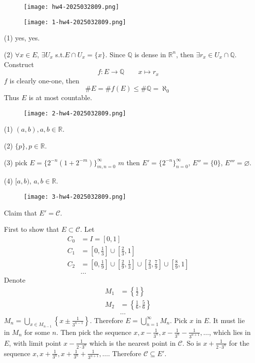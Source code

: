 \begin{figure}[H]
\centering
\texttt{[image: hw4-2025032809.png]}
\label{}
\end{figure}

\begin{figure}[H]
\centering
\texttt{[image: 1-hw4-2025032809.png]}
\label{}
\end{figure}

(1) yes, yes.

(2) $\forall x\in E$, $\exists U_{x}$ s.t.$E\cap U_{x}=\{ x \}$. Since $\mathbb{Q}$ is dense in $\mathbb{R}^{n}$, then $\exists r_{x}\in U_{x}\cap \mathbb{Q}$. Construct
\[
f:E\to \mathbb{Q}\qquad x\mapsto r_{x}
\]
$f$ is clearly one-one, then
\[
\#E=\#f(E)\leq \#\mathbb{Q}=\aleph_0
\]
Thus $E$ is at most countable.

\begin{figure}[H]
\centering
\texttt{[image: 2-hw4-2025032809.png]}
\label{}
\end{figure}

(1) $(a, b), a, b\in \mathbb{R}$.

(2) $\{ p \}, p\in \mathbb{R}$.

(3) pick $E=\{ 2^{-n}(1+2^{-m}) \}_{m,n=0}^{\infty}$ $m$ then $E'=\{ 2^{-n} \}_{n=0}^{\infty}$, $E''=\{ 0 \}$, $E'''=\varnothing$.

(4) $[a,b)$, $a, b\in \mathbb{R}$.

\begin{figure}[H]
\centering
\texttt{[image: 3-hw4-2025032809.png]}
\label{}
\end{figure}
Claim that $E'=\mathcal{C}$.

First to show that $E\subset \mathcal{C}$. Let
\[
\begin{aligned}
C_0 & =I=[0,1] \\
C_1 & =\left[ 0,\frac{1}{3} \right]\cup\left[ \frac{2}{3},1 \right]  \\
C_2 & =\left[ 0,\frac{1}{9} \right]\cup\left[ \frac{2}{9} ,\frac{1}{3} \right] \cup\left[ \frac{2}{3},\frac{7}{9} \right]\cup\left[ \frac{8}{9},1 \right] \\
 & \dots
\end{aligned}
\]
Denote
\[
\begin{aligned}
M_1 & =\left\{  \frac{1}{2}  \right\} \\
M_2 & =\left\{  \frac{1}{6},\frac{5}{6}  \right\} \\
 & \dots
\end{aligned}
\]
$M_n=\bigcup_{x\in M_{n-1}}\left\{  x\pm\frac{1}{3^{n-1}}  \right\}$. Therefore $E=\bigcup_{n=1}^{\infty}M_n$. Pick $x$ in $E$. It must lie in $M_n$ for some $n$. Then pick the sequence $x,x-\frac{1}{3^{n}},x-\frac{1}{3^{n}}-\frac{1}{3^{n+1}},\dots$, which lies in $E$, with limit point $x-\frac{1}{2\cdot3^{n}}$ which is the nearest point in $\mathcal{C}$. So is $x+\frac{1}{2\cdot3^{n}}$ for the sequence $x,x+\frac{1}{3^{n}},x+\frac{1}{3^{n}}+\frac{1}{3^{n+1}},\dots$. Therefore $\mathcal{C}\subseteq E'$.

